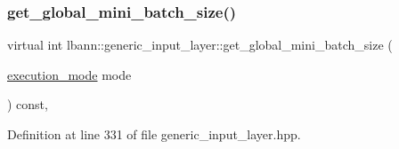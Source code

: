 \subsubsection{\texorpdfstring{get\+\_\+global\+\_\+mini\+\_\+batch\+\_\+size()}{get\_global\_mini\_batch\_size()}}
{\footnotesize\ttfamily virtual int lbann\+::generic\+\_\+input\+\_\+layer\+::get\+\_\+global\+\_\+mini\+\_\+batch\+\_\+size (\begin{DoxyParamCaption}\item[{\hyperlink{base_8hpp_a2781a159088df64ed7d47cc91c4dc0a8}{execution\+\_\+mode}}]{mode }\end{DoxyParamCaption}) const\hspace{0.3cm}{\ttfamily [inline]}, {\ttfamily [virtual]}}



Definition at line 331 of file generic\+\_\+input\+\_\+layer.\+hpp.


